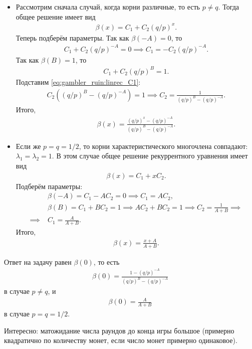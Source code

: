 \documentclass[../main.tex]{subfiles}
\begin{document}
\begin{exmpl}
  \begin{itemize}
   \item Рассмотрим сначала случай, когда корни различные, то есть $ p \neq q $. Тогда общее решение имеет вид
    \begin{align*}
     \beta(x) = C_1 + C_2 (q / p)^{x}.
    \end{align*} Теперь подберём параметры. Так как $ \beta(-A) = 0 $, то
    \begin{align}
     \label{eq:gambler_ruin:linrec_C1}
     C_1 + C_2 (q / p)^{-A} = 0 \implies C_1 = -C_2 (q / p)^{-A}.
    \end{align} Так как $ \beta(B) = 1 $, то
    \begin{align*}
     C_1 + C_2 (q / p)^{B} = 1.
    \end{align*} Подставим \eqref{eq:gambler_ruin:linrec_C1}:
    \begin{align*}
     C_2 \left( (q/ p)^{B} - (q / p)^{-A} \right) = 1 \implies C_2 = \frac{1}{(q / p)^{B} - (q / p)^{-A}}.
    \end{align*} Итого,
    \begin{align*}
     \beta(x) = \frac{(q / p)^{x} - (q / p)^{-A}}{(q / p)^{B} - (q / p)^{-A}}.
    \end{align*}
   \item Если же $ p = q = 1 / 2 $, то корни характеристического многочлена совпадают:  $ \lambda_1 = \lambda_2 = 1 $. В этом случае общее решение рекуррентного уравнения имеет вид
    \begin{align*}
     \beta(x) = C_1 + x C_2.
    \end{align*} Подберём параметры:
    \begin{align*}
     &\beta(-A) = C_1 - A C_2 = 0 \implies C_1 = A C_2,\\
     &\beta(B) = C_1 + B C_2 = 1 \implies A C_2 + B C_2 = 1 \implies C_2 = \frac{1}{A + B} \implies \\
     \implies \;&C_1 = \frac{A}{A + B}.
    \end{align*} Итого,
    \begin{align*}
     \beta(x) = \frac{x + A}{A + B}.
    \end{align*}
  \end{itemize}

  Ответ на задачу равен $ \beta(0) $, то есть
  \begin{align*}
   \beta(0) = \frac{1 - (q / p)^{-A}}{(q / p)^{B} - (q / p)^{-A}}
  \end{align*} в случае $ p \neq q $, и
  \begin{align*}
   \beta(0) = \frac{A}{A + B}
  \end{align*} в случае $ p = q = 1 / 2 $.

 \end{exmpl}

 Интересно: матожидание числа раундов до конца игры большое (примерно квадратично по количеству монет, если число монет примерно одинаковое).

 
\end{document}
